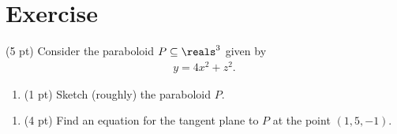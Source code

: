 \section{Exercise}

(5 pt) Consider the paraboloid $P \subseteq \reals^{3}$ given by
\begin{align*}
y
=
4 x^{2} + z^{2}.
\end{align*}
\begin{enumerate}[label=(\alph*)]
\item\label{itm: Sketch Surface} (1 pt) Sketch (roughly) the paraboloid $P$.
\end{enumerate}

\spaceSolution{1.5in}{%
}%



\begin{enumerate}[resume,label=(\alph*)]
\item (4 pt) Find an equation for the tangent plane to $P$ at the point $(1,5,-1)$. 
\end{enumerate}

\spaceSolution{5in}{%
}%